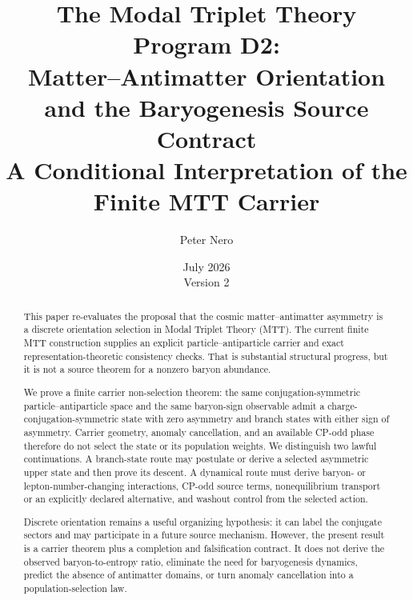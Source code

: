 \documentclass[11pt]{article}
\title{The Modal Triplet Theory Program D2:\\
Matter--Antimatter Orientation and the Baryogenesis Source Contract\\
\large A Conditional Interpretation of the Finite MTT Carrier}
\author{Peter Nero}
\date{July 2026\\Version 2}
\theoremstyle{definition}
\theoremstyle{remark}
\begin{document}
\maketitle

\begin{abstract}
This paper re-evaluates the proposal that the cosmic matter--antimatter
asymmetry is a discrete orientation selection in Modal Triplet Theory (MTT).
The current finite MTT construction supplies an explicit
particle--antiparticle carrier and exact representation-theoretic consistency
checks.  That is substantial structural progress, but it is not a source
theorem for a nonzero baryon abundance.

We prove a finite carrier non-selection theorem: the same conjugation-symmetric
particle--antiparticle space and the same baryon-sign observable admit a
charge-conjugation-symmetric state with zero asymmetry and branch states with
either sign of asymmetry.  Carrier geometry, anomaly cancellation, and an
available CP-odd phase therefore do not select the state or its population
weights.  We distinguish two lawful continuations.  A branch-state route may
postulate or derive a selected asymmetric upper state and then prove its
descent.  A dynamical route must derive baryon- or lepton-number-changing
interactions, CP-odd source terms, nonequilibrium transport or an explicitly
declared alternative, and washout control from the selected action.

Discrete orientation remains a useful organizing hypothesis: it can label
the conjugate sectors and may participate in a future source mechanism.
However, the present result is a carrier theorem plus a completion and
falsification contract.  It does not derive the observed baryon-to-entropy
ratio, eliminate the need for baryogenesis dynamics, predict the absence of
antimatter domains, or turn anomaly cancellation into a population-selection
law.
\end{abstract}
\end{document}
